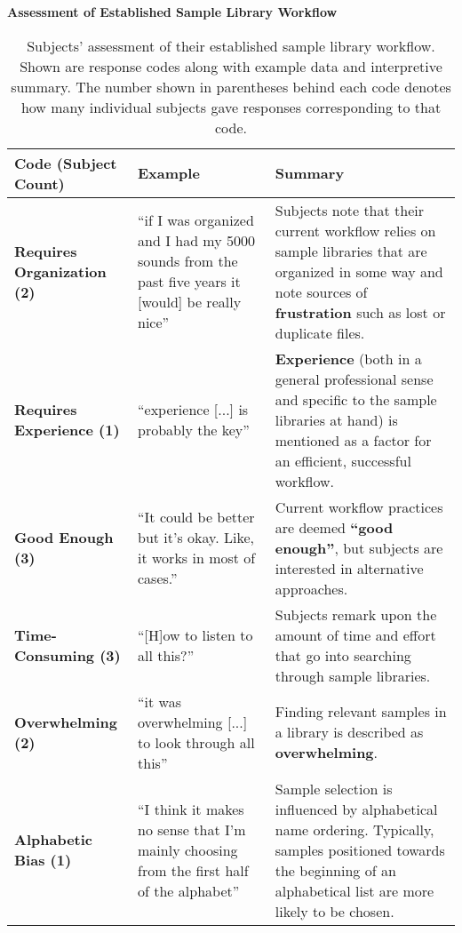 


\begin{table}[!htb]
  \renewcommand{\arraystretch}{1.2}
  \centering
  \textbf{Assessment of Established Sample Library Workflow} \\ [3mm]
  \footnotesize
  \colorbox{light-bg}{
  \begin{tabular}{ p{4.0cm} p{4.75cm} p{4.75cm} }
  \hline
    \textbf{Code (Subject Count)} & \textbf{Example} & \textbf{Summary} \\
    \hline
    \textbf{Requires Organization (2)}
    &
    ``if I was organized and I had my 5000 sounds from the past five years it
    [would] be really nice''
    &
    Subjects note that their current workflow relies on sample libraries that
    are organized in some way and note sources of \textbf{frustration} such as
    lost or duplicate files.
    \\
    \textbf{Requires Experience (1)}
    &
    ``experience [...] is probably the key''
    &
    \textbf{Experience} (both in a general professional sense and specific to
    the sample libraries at hand) is mentioned as a factor for an efficient,
    successful workflow.
    \\
    \textbf{Good Enough (3)}
    &
    ``It could be better but it's okay. Like, it works in most of cases.''
    &
    Current workflow practices are deemed \textbf{``good enough''}, but subjects
    are interested in alternative approaches.
    \\
    \textbf{Time-Consuming (3)}
    &
    ``[H]ow to listen to all this?''
    &
    Subjects remark upon the amount of time and effort that go into searching
    through sample libraries.
    \\
    \textbf{Overwhelming (2)}
    &
    ``it was overwhelming [...] to look through all this''
    &
    Finding relevant samples in a library is described as \textbf{overwhelming}.
    \\
    \textbf{Alphabetic Bias (1)}
    &
    ``I think it makes no sense that I'm mainly choosing from the first half of
    the alphabet''
    &
    Sample selection is influenced by alphabetical name ordering. Typically,
    samples positioned towards the beginning of an alphabetical list are more
    likely to be chosen.
    \\
  \end{tabular}}
  \caption[Established Sample Library Workflow Assessment: Response Codes]
  {Subjects' assessment of their established sample library workflow. Shown are
  response codes along with example data and interpretive summary. The number
  shown in parentheses behind each code denotes how many individual subjects
  gave responses corresponding to that code.}
  \label{table:current_workflow_assessment}
\end{table}

